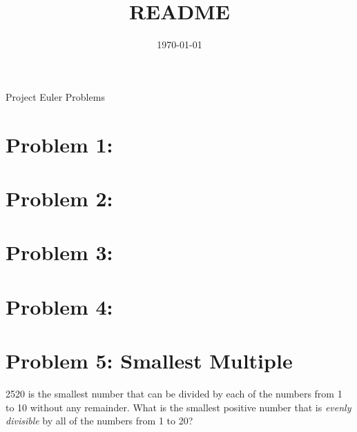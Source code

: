 \documentclass[11pt]{article}
\date{\today}
\title{README}
\begin{document}
\maketitle
\tableofcontents

Project Euler Problems

\section{Problem 1:}
\label{sec-1}
\section{Problem 2:}
\label{sec-2}
\section{Problem 3:}
\label{sec-3}
\section{Problem 4:}
\label{sec-4}
\section{Problem 5: Smallest Multiple}
\label{sec-5}

2520 is the smallest number that can be divided by each of the numbers 
from 1 to 10 without any remainder. What is the smallest positive number that
is \emph{evenly divisible} by all of the numbers from 1 to 20?
\end{document}
